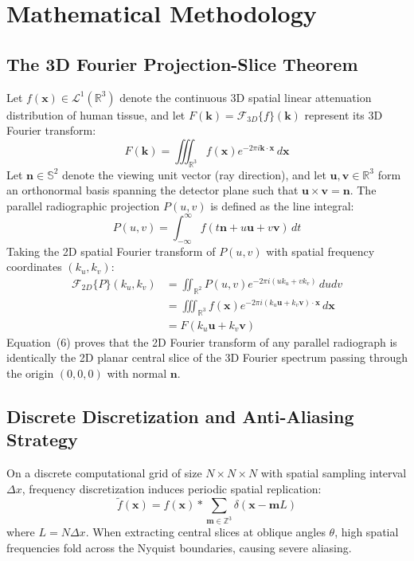 \documentclass[journal,twocolumn]{IEEEtran}
\begin{document}
\section{Mathematical Methodology}

\subsection{The 3D Fourier Projection-Slice Theorem}
Let $f(\mathbf{x}) \in \mathcal{L}^1(\mathbb{R}^3)$ denote the continuous 3D spatial linear attenuation distribution of human tissue, and let $F(\mathbf{k}) = \mathcal{F}_{3D}\{f\}(\mathbf{k})$ represent its 3D Fourier transform:
\begin{equation}
F(\mathbf{k}) = \iiint_{\mathbb{R}^3} f(\mathbf{x}) e^{-2\pi i \mathbf{k} \cdot \mathbf{x}} \, d\mathbf{x}
\end{equation}
Let $\mathbf{n} \in \mathbb{S}^2$ denote the viewing unit vector (ray direction), and let $\mathbf{u}, \mathbf{v} \in \mathbb{R}^3$ form an orthonormal basis spanning the detector plane such that $\mathbf{u} \times \mathbf{v} = \mathbf{n}$. The parallel radiographic projection $P(u, v)$ is defined as the line integral:
\begin{equation}
P(u, v) = \int_{-\infty}^{\infty} f(t\mathbf{n} + u\mathbf{u} + v\mathbf{v}) \, dt
\end{equation}
Taking the 2D spatial Fourier transform of $P(u, v)$ with spatial frequency coordinates $(k_u, k_v)$:
\begin{align}
\mathcal{F}_{2D}\{P\}(k_u, k_v) &= \iint_{\mathbb{R}^2} P(u, v) e^{-2\pi i (u k_u + v k_v)} \, du dv \\
&= \iiint_{\mathbb{R}^3} f(\mathbf{x}) e^{-2\pi i (k_u \mathbf{u} + k_v \mathbf{v}) \cdot \mathbf{x}} \, d\mathbf{x} \\
&= F(k_u \mathbf{u} + k_v \mathbf{v})
\end{align}
Equation~(6) proves that the 2D Fourier transform of any parallel radiograph is identically the 2D planar central slice of the 3D Fourier spectrum passing through the origin $(0, 0, 0)$ with normal $\mathbf{n}$.

\subsection{Discrete Discretization and Anti-Aliasing Strategy}
On a discrete computational grid of size $N \times N \times N$ with spatial sampling interval $\Delta x$, frequency discretization induces periodic spatial replication:
\begin{equation}
\tilde{f}(\mathbf{x}) = f(\mathbf{x}) * \sum_{\mathbf{m} \in \mathbb{Z}^3} \delta(\mathbf{x} - \mathbf{m} L)
\end{equation}
where $L = N \Delta x$. When extracting central slices at oblique angles $\theta$, high spatial frequencies fold across the Nyquist boundaries, causing severe aliasing.
\end{document}
